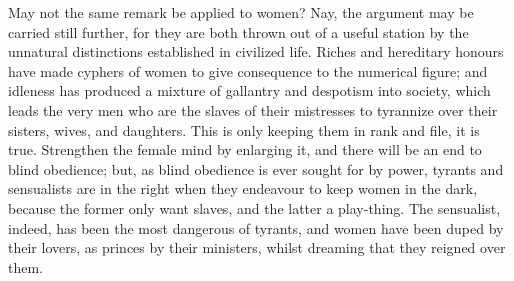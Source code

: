 May not the same remark be applied to women? Nay, the argument may be
carried still further, for they are both thrown out of a useful
station by the unnatural distinctions established in civilized life.
Riches and hereditary honours have made cyphers of women to give
consequence to the numerical figure; and idleness has produced a
mixture of gallantry and despotism into society, which leads the very
men who are the slaves of their mistresses to tyrannize over their
sisters, wives, and daughters. This is only keeping them in rank and
file, it is true. Strengthen the female mind by enlarging it, and
there will be an end to blind obedience; but, as blind obedience is
ever  sought for by power, tyrants and sensualists are in the
right when they endeavour to keep women in the dark, because the
former only want slaves, and the latter a play-thing. The sensualist,
indeed, has been the most dangerous of tyrants, and women have been
duped by their lovers, as princes by their ministers, whilst dreaming
that they reigned over them.


